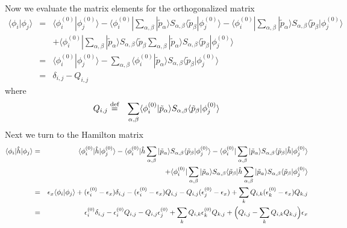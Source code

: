 \documentclass[11pt,a4paper]{report}
\begin{document}
Now we evaluate the matrix elements for the orthogonalized matrix
\begin{eqnarray}
\langle\phi_i|\phi_j\rangle&=&
\langle\phi_i^{(0)}|\phi_j^{(0)}\rangle
-\langle\phi_i^{(0)}|\sum_{\alpha,\beta}|\tilde{p}_\alpha\rangle
S_{\alpha,\beta}\langle\tilde{p}_\beta|\phi_j^{(0)}\rangle
-\langle\phi_i^{(0)}|\sum_{\alpha,\beta}|\tilde{p}_\alpha\rangle S_{\alpha,\beta}\langle\tilde{p}_\beta|\phi_j^{(0)}\rangle
\nonumber\\
&&+
\langle\phi_i^{(0)}|\sum_{\alpha,\beta}|\tilde{p}_\alpha\rangle S_{\alpha,\beta}\langle\tilde{p}_\beta\sum_{\alpha,\beta}|\tilde{p}_\alpha\rangle S_{\alpha,\beta}\langle\tilde{p}_\beta|\phi_j^{(0)}\rangle
\nonumber\\
&=&
\langle\phi_i^{(0)}|\phi_j^{(0)}\rangle
-\sum_{\alpha,\beta}\langle\phi_i^{(0)}|\tilde{p}_\alpha\rangle
S_{\alpha,\beta}\langle\tilde{p}_\beta|\phi_j^{(0)}\rangle
\nonumber\\
&=&
\delta_{i,j}-Q_{i,j}
\end{eqnarray}
where
\begin{eqnarray}
Q_{i,j}&\stackrel{\text{def}}{=}&\sum_{\alpha,\beta}\langle\phi_i^{(0)}|\tilde{p}_\alpha\rangle
S_{\alpha,\beta}\langle\tilde{p}_\beta|\phi_j^{(0)}\rangle
\end{eqnarray}
%
Next we turn to the Hamilton matrix
\begin{eqnarray}
\langle\phi_i|\hat{h}|\phi_j\rangle
&=&
\langle\phi_i^{(0)}|\hat{h}|\phi_j^{(0)}\rangle
-\langle\phi_i^{(0)}|\hat{h}\sum_{\alpha,\beta}|\tilde{p}_\alpha\rangle
S_{\alpha,\beta}\langle\tilde{p}_\beta|\phi_j^{(0)}\rangle
-\langle\phi_i^{(0)}|\sum_{\alpha,\beta}|\tilde{p}_\alpha\rangle S_{\alpha,\beta}\langle\tilde{p}_\beta|\hat{h}|\phi_j^{(0)}\rangle
\nonumber\\
&&+
\langle\phi_i^{(0)}|\sum_{\alpha,\beta}|\tilde{p}_\alpha\rangle S_{\alpha,\beta}\langle\tilde{p}_\beta|\hat{h}\sum_{\alpha,\beta}|\tilde{p}_\alpha\rangle S_{\alpha,\beta}\langle\tilde{p}_\beta|\phi_j^{(0)}\rangle
\nonumber\\
&=&\epsilon_x\langle\phi_i|\phi_j\rangle
+(\epsilon_i^{(0)}-\epsilon_x)\delta_{i,j}
-(\epsilon_i^{(0)}-\epsilon_x)Q_{i,j}
-Q_{i,j}(\epsilon_j^{(0)}-\epsilon_x)
+\sum_k Q_{i,k}(\epsilon_k^{(0)}-\epsilon_x)Q_{k,j}
\nonumber\\
&=&
\epsilon_i^{(0)}\delta_{i,j}
-\epsilon_i^{(0)}Q_{i,j}
-Q_{i,j}\epsilon_j^{(0)}
+\sum_k Q_{i,k}\epsilon_k^{(0)}Q_{k,j}
+\Bigl(Q_{i,j}-\sum_k Q_{i,k}Q_{k,j}\Bigr)
\epsilon_x
\end{eqnarray}
\end{document}
